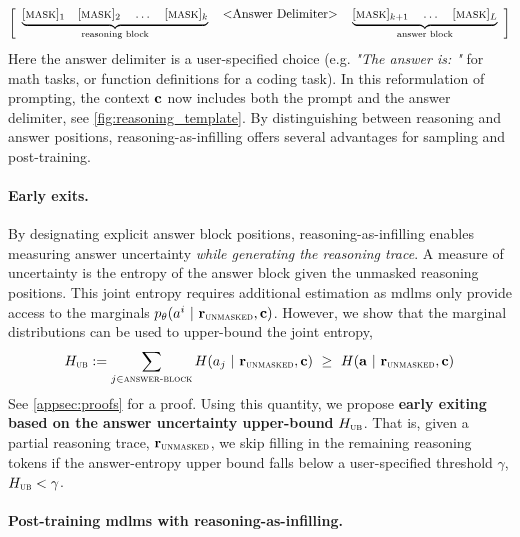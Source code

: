  \begin{align}\label{eq:reasoning_as_infilling}\nonumber
\left[\begin{array}{l}
\underbrace{[\textsc{mask}]_1 \quad [\textsc{mask}]_2 \quad \dots \quad [\textsc{mask}]_k}_{\text{reasoning block}} \quad \text{<Answer Delimiter>} \quad 
\underbrace{[\textsc{mask}]_{k+1} \quad \dots \quad [\textsc{mask}]_L}_{\text{answer block}}
\end{array}\right]
\end{align}
Here the answer delimiter is a user-specified choice (e.g. \textit{"The answer is: "} for math tasks, or function definitions for a coding task). In this reformulation of prompting, the context $\mathbf{c}$ now includes both the prompt and the answer delimiter, see \cref{fig:reasoning_template}. 
By distinguishing between reasoning and answer positions, reasoning-as-infilling offers several advantages for sampling and post-training. 







\paragraph{Early exits.}
By designating explicit answer block positions, reasoning-as-infilling enables measuring answer uncertainty \textit{while generating the reasoning trace}. A measure of uncertainty is the entropy of the answer block given the unmasked reasoning positions. This joint entropy requires additional estimation as \glspl{mdlm} only provide access to the marginals
$p_\theta( a^i ~\vert~ \mathbf{r}_\textsc{unmasked}, \mathbf{c})$. However, we show that the marginal distributions can be used to upper-bound the joint entropy,
\begin{align}
   H_{\textsc{ub}} := \sum_{j \in \textsc{answer-block}} H(a_j ~\vert~ \mathbf{r}_{\textsc{unmasked}}, \mathbf{c}) \, \, \geq  \, \,  H(\mathbf{a} ~\vert~ \mathbf{r}_{\textsc{unmasked}}, \mathbf{c})
\end{align}
See \cref{appsec:proofs} for a proof. Using this quantity, we propose \textbf{early exiting based on the answer uncertainty upper-bound} $H_\textsc{ub}$. That is, given a partial reasoning trace, $\mathbf{r}_\textsc{unmasked}$, we skip filling in the remaining reasoning tokens if the answer-entropy upper bound falls below a user-specified threshold $\gamma$, $H_\textsc{ub} < \gamma$.




\paragraph{Post-training \glspl{mdlm} with reasoning-as-infilling.}

